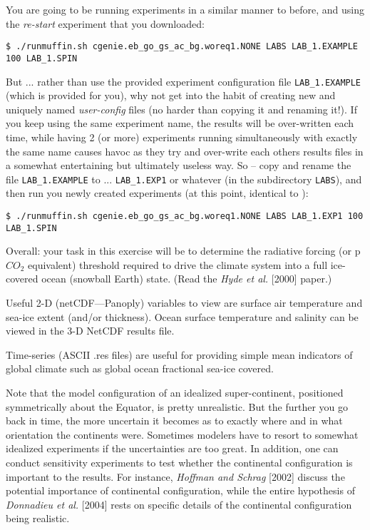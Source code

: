 \documentclass[11pt,fleqn]{book} %
\begin{document}
\noindent You are going to be running experiments in a similar manner to before, and using the \textit{re-start} experiment that you downloaded:
\vspace{-1mm}
\small\begin{verbatim}
$ ./runmuffin.sh cgenie.eb_go_gs_ac_bg.woreq1.NONE LABS LAB_1.EXAMPLE 100 LAB_1.SPIN
\end{verbatim}\normalsize
\noindent But ... rather than use the provided experiment configuration file \texttt{LAB\_1.EXAMPLE} (which is provided for you), why not get into the habit of creating new and uniquely named \textit{user-config} files (no harder than copying it and renaming it!). If you keep using the same experiment name, the results will be over-written each time, while having  2 (or more) experiments running simultaneously with exactly the same name causes havoc as they try and over-write each others results files in a somewhat entertaining but ultimately useless way. So -- copy and rename the file \texttt{LAB\_1.EXAMPLE} to ... \texttt{LAB\_1.EXP1} or whatever (in the subdirectory \texttt{LABS}), and then run you newly created experiments (at this point, identical to ):
\vspace{-1mm}
\small\begin{verbatim}
$ ./runmuffin.sh cgenie.eb_go_gs_ac_bg.woreq1.NONE LABS LAB_1.EXP1 100 LAB_1.SPIN
\end{verbatim}\normalsize

Overall: your task in this exercise will be to determine the radiative forcing (or p\(CO_{2}\) equivalent) threshold required to drive the climate system into a full ice-covered ocean (snowball Earth) state. (Read the \textit{Hyde et al.} [2000] paper.)

Useful 2-D (netCDF—Panoply) variables to view are surface air temperature and sea-ice extent (and/or thickness). Ocean surface temperature and salinity can be viewed in the 3-D NetCDF results file.

Time-series (ASCII .res files) are useful for providing simple mean indicators of global climate such as global ocean fractional sea-ice covered.

Note that the model configuration of an idealized super-continent, positioned symmetrically about the Equator, is pretty unrealistic. But the further you go back in time, the more uncertain it becomes as to exactly where and in what orientation the continents were. Sometimes modelers have to resort to somewhat idealized experiments if the uncertainties are too great. In addition, one can conduct sensitivity experiments to test whether the continental configuration is important to the results. For instance, \textit{Hoffman and Schrag} [2002] discuss the potential importance of continental configuration, while the entire hypothesis of \textit{Donnadieu et al.} [2004] rests on specific details of the continental configuration being realistic.
\end{document}
